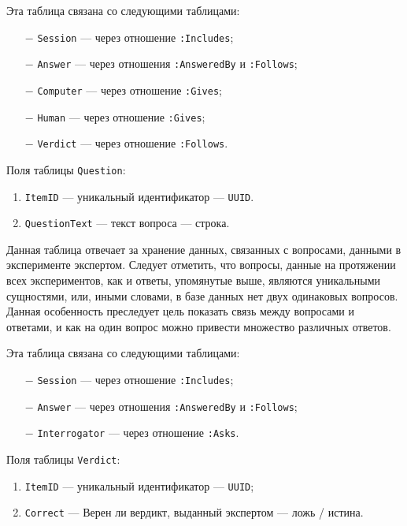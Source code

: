 Эта таблица связана со следующими таблицами:
\begin{itemize}
    \item[$-$] \texttt{Session} --- через отношение \texttt{:Includes};
    \item[$-$] \texttt{Answer} --- через отношения \texttt{:AnsweredBy} и \texttt{:Follows};
    \item[$-$] \texttt{Computer} --- через отношение \texttt{:Gives};
    \item[$-$] \texttt{Human} --- через отношение \texttt{:Gives};
    \item[$-$] \texttt{Verdict} --- через отношение \texttt{:Follows}.
\end{itemize}

Поля таблицы \texttt{Question}:
\begin{enumerate}
    \item \texttt{ItemID} --- уникальный идентификатор --- \texttt{UUID}.
    \item \texttt{QuestionText} --- текст вопроса --- строка.
\end{enumerate}

Данная таблица отвечает за хранение данных, связанных с вопросами, данными в эксперименте экспертом. 
Следует отметить, что вопросы, данные на протяжении всех экспериментов, как и ответы, упомянутые выше, являются уникальными сущностями, или, иными словами, в базе данных нет двух одинаковых вопросов.
Данная особенность преследует цель показать связь между вопросами и ответами, и как на один вопрос можно привести множество различных ответов.

Эта таблица связана со следующими таблицами:
\begin{itemize}
    \item[$-$] \texttt{Session} --- через отношение \texttt{:Includes};
    \item[$-$] \texttt{Answer} --- через отношения \texttt{:AnsweredBy} и \texttt{:Follows};
    \item[$-$] \texttt{Interrogator} --- через отношение \texttt{:Asks}.
\end{itemize}

Поля таблицы \texttt{Verdict}:
\begin{enumerate}
    \item \texttt{ItemID} --- уникальный идентификатор --- \texttt{UUID};
    \item \texttt{Correct} --- Верен ли вердикт, выданный экспертом --- ложь / истина.
\end{enumerate}

